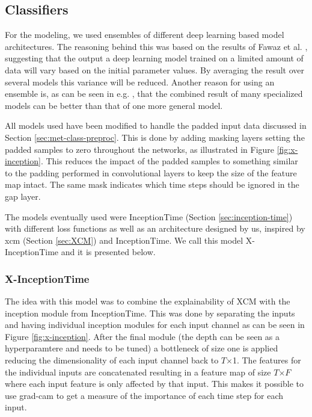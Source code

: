 \subsection{Classifiers}
For the modeling, we used ensembles of different deep learning based model architectures. The reasoning behind this was based on the results of Fawaz et al. \cite{IsmailFawaz2019ensemble}, suggesting that the output a deep learning model trained on a limited amount of data will vary based on the initial parameter values. By averaging the result over several models this variance will be reduced. Another reason for using an ensemble is, as can be seen in e.g. \cite{Bagnall2015, Lines2016}, that the combined result of many specialized models can be better than that of one more general model. %

All models used have been modified to handle the padded input data discussed in Section \ref{sec:met-class-preproc}. This is done by adding masking layers setting the padded samples to zero throughout the networks, as illustrated in Figure \ref{fig:x-inception}. This reduces the impact of the padded samples to something similar to the padding performed in convolutional layers to keep the size of the feature map intact. The same mask indicates which time steps should be ignored in the \gls{gap} layer.

The models eventually used were InceptionTime (Section \ref{sec:inception-time}) with different loss functions as well as an architecture designed by us, inspired by
\gls{xcm} (Section \ref{sec:XCM}) and InceptionTime. We call this model X-InceptionTime and it is presented below.

\subsubsection{X-InceptionTime} \label{sec:xinception}
The idea with this model was to combine the explainability of XCM with the inception module from InceptionTime. This was done by separating the inputs and having individual inception modules for each input channel as can be seen in Figure \ref{fig:x-inception}. After the final module (the depth can be seen as a hyperparamtere and needs to be tuned) a bottleneck of size one is applied reducing the dimensionality of each input channel back to $T$$\times$1. The features for the individual inputs are concatenated resulting in a feature map of size $T$$\times$$F$ where each input feature is only affected by that input. This makes it possible to use \gls{grad-cam} to get a measure of the importance of each time step for each input.

